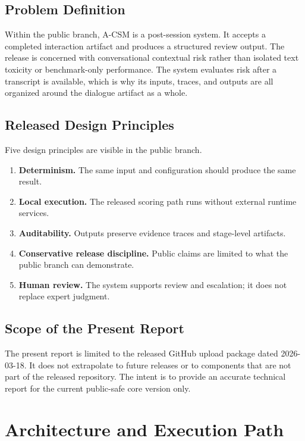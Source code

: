 \documentclass[11pt,a4paper]{article}
\begin{document}
\subsection{Problem Definition}

Within the public branch, A-CSM is a post-session system. It accepts a completed interaction artifact and produces a structured review output. The release is concerned with conversational contextual risk rather than isolated text toxicity or benchmark-only performance. The system evaluates risk after a transcript is available, which is why its inputs, traces, and outputs are all organized around the dialogue artifact as a whole.

\subsection{Released Design Principles}

Five design principles are visible in the public branch.

\begin{enumerate}[leftmargin=1.8em]
\item \textbf{Determinism.} The same input and configuration should produce the same result.
\item \textbf{Local execution.} The released scoring path runs without external runtime services.
\item \textbf{Auditability.} Outputs preserve evidence traces and stage-level artifacts.
\item \textbf{Conservative release discipline.} Public claims are limited to what the public branch can demonstrate.
\item \textbf{Human review.} The system supports review and escalation; it does not replace expert judgment.
\end{enumerate}

\subsection{Scope of the Present Report}

The present report is limited to the released GitHub upload package dated 2026-03-18. It does not extrapolate to future releases or to components that are not part of the released repository. The intent is to provide an accurate technical report for the current public-safe core version only.

\section{Architecture and Execution Path}
\end{document}
